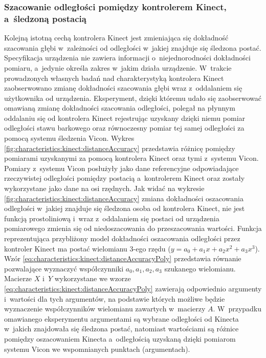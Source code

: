 \subsubsection*{Szacowanie odległości pomiędzy kontrolerem Kinect, a~śledzoną postacią}\label{sssection:distanceEstimation}
Kolejną istotną cechą kontrolera Kinect jest zmieniająca się dokładność szacowania głębi w~zależności od odległości w~jakiej znajduje się śledzona postać. Specyfikacja urządzenia nie zawiera informacji o~niejednorodności dokładności pomiaru, a~jedynie określa zakres w~jakim działa urządzenie. W~trakcie prowadzonych własnych badań nad charakterystyką kontrolera Kinect zaobserwowano zmianę dokładności szacowania głębi wraz z~oddalaniem się użytkownika od urządzenia. Eksperyment, dzięki któremu udało się zaobserwować omawianą zmianę dokładności szacowania odległości, polegał na płynnym oddalaniu się od kontrolera Kinect rejestrując uzyskany dzięki niemu pomiar odległości stawu barkowego oraz równoczesny pomiar tej samej odległości za pomocą systemu śledzenia Vicon. Wykres \ref{fig:characteristics:kinect:distanceAccuracy} przedstawia różnicę pomiędzy pomiarami uzyskanymi za pomocą kontrolera Kinect oraz tymi z~systemu Vicon. Pomiary z~systemu Vicon posłużyły jako dane referencyjne odpowiadające rzeczywistej odległości pomiędzy postacią a~kontrolerem Kinect oraz zostały wykorzystane jako dane na osi rzędnych. Jak widać na wykresie \ref{fig:characteristics:kinect:distanceAccuracy} zmiana dokładności oszacowania odległości w~jakiej znajduje się śledzona osoba od kontrolera Kinect, nie jest funkcją prostoliniową i~wraz z~oddalaniem się postaci od urządzenia pomiarowego zmienia się od niedoszacowania do przeszacowania wartości. Funkcja reprezentująca przybliżony model dokładności oszacowania odległości przez kontroler Kinect ma postać wielomianu 3-ego rzędu ($y = a_0 + a_1x + a_2x^2 + a_3x^3$). Wzór \ref{eq:characteristics:kinect:distanceAccuracyPoly} przedstawia równanie pozwalające wyznaczyć współczynniki $a_0 ,a_1, a_2, a_3$ szukanego wielomianu. Macierze $X$ i~$Y$ wykorzystane we wzorze \ref{eq:characteristics:kinect:distanceAccuracyPoly} zawierają odpowiednio argumenty i~wartości dla tych argumentów, na podstawie których możliwe będzie wyznaczenie współczynników wielomianu zawartych w~macierzy $A$. W~przypadku omawianego eksperymentu argumentami są wybrane odległości od Kinecta w~jakich znajdowała się śledzona postać, natomiast wartościami są różnice pomiędzy oszacowaniem Kinecta a~odległością uzyskaną dzięki pomiarom systemu Vicon we wspomnianych punktach (argumentach).
																																							
